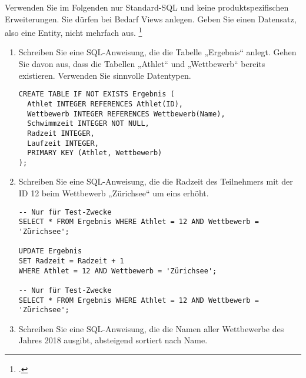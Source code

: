 \documentclass{bschlangaul-aufgabe}
\begin{document}
\noindent
Verwenden Sie im Folgenden nur Standard-SQL und keine
produktspezifischen Erweiterungen. Sie dürfen bei Bedarf Views anlegen.
Geben Sie einen Datensatz, also eine Entity, nicht mehrfach aus.
\footcite{examen:66116:2018:09}

\begin{enumerate}


\item Schreiben Sie eine SQL-Anweisung, die die Tabelle „Ergebnis“
anlegt. Gehen Sie davon aus, dass die Tabellen „Athlet“ und
„Wettbewerb“ bereits existieren. Verwenden Sie sinnvolle Datentypen.

\begin{bAntwort}
\begin{verbatim}
CREATE TABLE IF NOT EXISTS Ergebnis (
  Athlet INTEGER REFERENCES Athlet(ID),
  Wettbewerb INTEGER REFERENCES Wettbewerb(Name),
  Schwimmzeit INTEGER NOT NULL,
  Radzeit INTEGER,
  Laufzeit INTEGER,
  PRIMARY KEY (Athlet, Wettbewerb)
);
\end{verbatim}

\end{bAntwort}


\item Schreiben Sie eine SQL-Anweisung, die die Radzeit des Teilnehmers
mit der ID 12 beim Wettbewerb „Zürichsee“ um eins erhöht.

\begin{bAntwort}
\begin{verbatim}
-- Nur für Test-Zwecke
SELECT * FROM Ergebnis WHERE Athlet = 12 AND Wettbewerb = 'Zürichsee';

UPDATE Ergebnis
SET Radzeit = Radzeit + 1
WHERE Athlet = 12 AND Wettbewerb = 'Zürichsee';

-- Nur für Test-Zwecke
SELECT * FROM Ergebnis WHERE Athlet = 12 AND Wettbewerb = 'Zürichsee';
\end{verbatim}
\end{bAntwort}


\item Schreiben Sie eine SQL-Anweisung, die die Namen aller Wettbewerbe
des Jahres 2018 ausgibt, absteigend sortiert nach Name.


\end{enumerate}
\end{document}
